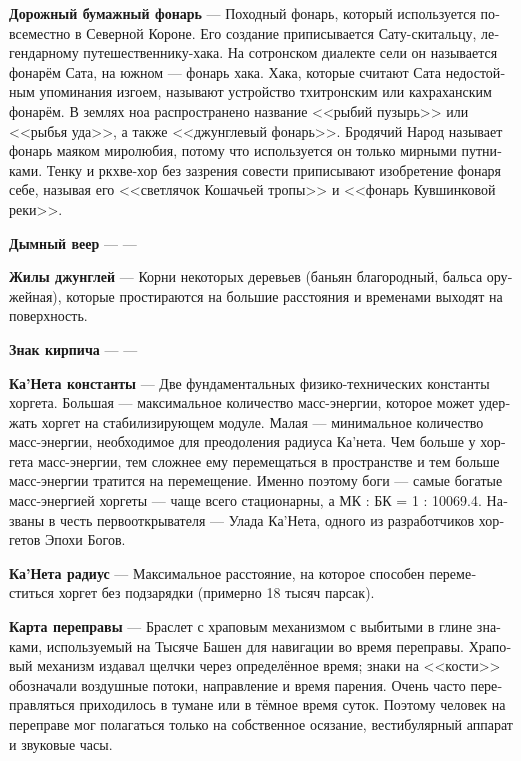 \documentclass[a4paper,12pt,fleqn]{book}\usepackage{polyglossia}\setdefaultlanguage[babelshorthands=true]{russian}\setotherlanguage{english}\defaultfontfeatures{Ligatures=TeX,Mapping=tex-text}\usepackage{xcolor}\newcommand{\ml}[3]{#2}
\newcommand{\theterm}[3]{\textbf{\hypertarget{#1}{#2}} --- #3}
\begin{document}
{\theterm{stray-lantern}
{Дорожный бумажный фонарь}
{Походный фонарь, который используется повсеместно в Северной Короне.
Его создание приписывается Сату-скитальцу, легендарному путешественнику-хака.
На сотронском диалекте сели он называется фонарём Сата, на южном --- фонарь хака.
Хака, которые считают Сата недостойным упоминания изгоем, называют устройство тхитронским или кахраханским фонарём.
В землях ноа распространено название <<рыбий пузырь>> или <<рыбья уда>>, а также <<джунглевый фонарь>>.
Бродячий Народ называет фонарь маяком миролюбия, потому что используется он только мирными путниками.
Тенку и ркхве-хор без зазрения совести приписывают изобретение фонаря себе, называя его <<светлячок Кошачьей тропы>> и <<фонарь Кувшинковой реки>>.}

\theterm{fume-fan}
{Дымный веер}
{---}

\theterm{silva-veins}
{Жилы джунглей}
{Корни некоторых деревьев (баньян благородный, бальса оружейная), которые простираются на большие расстояния и временами выходят на поверхность.}

\theterm{brick-sign}
{Знак кирпича}
{---}

\theterm{canet-constantae} %
{Ка'Нета константы}
{Две фундаментальных физико-технических константы хоргета.
Большая --- максимальное количество масс-энергии, которое может удержать хоргет на стабилизирующем модуле. Малая --- минимальное количество масс-энергии, необходимое для преодоления радиуса Ка'нета.
Чем больше у хоргета масс-энергии, тем сложнее ему перемещаться в пространстве и тем больше масс-энергии тратится на перемещение.
Именно поэтому боги --- самые богатые масс-энергией хоргеты --- чаще всего стационарны, а МК : БК = 1 : 10069.4.
Названы в честь первооткрывателя --- Улада Ка'Нета, одного из разработчиков хоргетов Эпохи Богов.}

\theterm{canet-radius} %
{Ка'Нета радиус}
{Максимальное расстояние, на которое способен переместиться хоргет без подзарядки (примерно 18 тысяч парсак).}

\theterm{c-map}
{Карта переправы}
{Браслет с храповым механизмом с выбитыми в глине знаками, используемый на Тысяче Башен для навигации во время переправы.
Храповый механизм издавал щелчки через определённое время;
знаки на <<кости>> обозначали воздушные потоки, направление и время парения.
Очень часто переправляться приходилось в тумане или в тёмное время суток.
Поэтому человек на переправе мог полагаться только на собственное осязание, вестибулярный аппарат и звуковые часы.}

}
\end{document}
